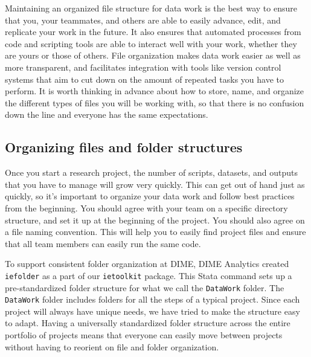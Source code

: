 Maintaining an organized file structure for data work is the best way
to ensure that you, your teammates, and others
are able to easily advance, edit, and replicate your work in the future.
It also ensures that automated processes from code and scripting tools
are able to interact well with your work,
whether they are yours or those of others.
File organization makes data work easier as well as more transparent,
and facilitates integration with tools like version control systems
that aim to cut down on the amount of repeated tasks you have to perform.
It is worth thinking in advance about how to store, name, and organize
the different types of files you will be working with,
so that there is no confusion down the line
and everyone has the same expectations.

\subsection{Organizing files and folder structures}

Once you start a research project,
the number of scripts, datasets, and outputs that you have to manage will grow very quickly.
This can get out of hand just as quickly,
so it's important to organize your data work and follow best practices from the beginning.
You should agree with your team on a specific directory structure,
and set it up at the beginning of the project.
You should also agree on a file naming convention.
This will help you to easily find project files and
ensure that all team members can easily run the same code.

To support consistent folder organization at DIME,
DIME Analytics created \texttt{iefolder}
as a part of our \texttt{ietoolkit} package.
This Stata command sets up a pre-standardized folder structure
for what we call the \texttt{DataWork} folder.
The \texttt{DataWork} folder includes folders for all the steps of a typical project.
Since each project will always have unique needs,
we have tried to make the structure easy to adapt.
Having a universally standardized folder structure
across the entire portfolio of projects
means that everyone can easily move between projects
without having to reorient on file and folder organization.

